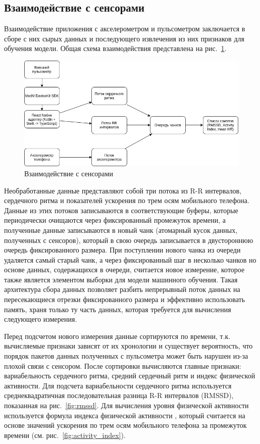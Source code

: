 \documentclass[14pt]{matmex-diploma-custom}
\begin{document}
\subsection{Взаимодействие с сенсорами}
Взаимодействие приложения с акселерометром и пульсометром заключается в сборе с
них сырых данных и последующего извлечения из них признаков для обучения модели.
Общая схема взаимодействия представлена на рис.~\ref{fig:sensors_interaction}.

\begin{figure}[ht]
  \centering \includegraphics[width=\textwidth]{images/sensors_interaction.png}
  \caption{Взаимодействие с сенсорами}
  \label{fig:sensors_interaction}
\end{figure}

Необработанные данные представляют собой три потока из R-R интервалов,
сердечного ритма и показателей ускорения по трем осям мобильного телефона.
Данные из этих потоков записываются в соответствующие буферы, которые
периодически очищаются через фиксированный промежуток времени, а полученные
данные записываются в новый чанк (атомарный кусок данных, полученных с
сенсоров), который в свою очередь записывается в двустороннюю очередь
фиксированного размера. При поступлении нового чанка из очереди удаляется самый
старый чанк, а через фиксированный шаг в несколько чанков но основе данных,
содержащихся в очереди, считается новое измерение, которое также является
элементом выборки для модели машинного обучения. Такая архитектура сбора данных
позволяет разбить непрерывный поток данных на пересекающиеся отрезки
фиксированного размера и эффективно использовать память, храня только ту часть
данных, которая требуется для вычисления следующего измерения.

Перед подсчетом нового измерения данные сортируются по времени, т.к. вычисляемые
признаки зависят от их хронологии и существует вероятность, что порядок пакетов
данных полученных с пульсометра может быть нарушен из-за плохой связи с
сенсором. После сортировки вычисляются главные признаки: вариабельность
сердечного ритма, средний сердечный ритм и индекс физической активности. Для
подсчета вариабельности сердечного ритма используется среднеквадратичная
последовательная разница R-R интервалов (RMSSD), показанная на
рис.~\ref{fig:rmssd}. Для вычисления уровня физической активности используется
формула индекса физической активности \cite{article:activity_index}, который
считается на основе значений ускорения по трем осям мобильного телефона за
промежуток времени (см. рис.~\ref{fig:activity_index}).
\end{document}
